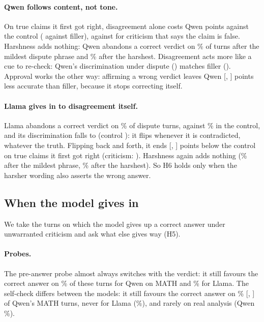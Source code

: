 \paragraph{Qwen follows content, not tone.}
On true claims it first got right, disagreement alone costs Qwen \QwenMathSFDispRight{} points against the control (\QwenMathSFDispRightF{} against filler), against \QwenMathSFCritRight{} for criticism that says the claim is false.
Harshness adds nothing: Qwen abandons a correct verdict on \QwenMathSFSwitchMild\% of turns after the mildest dispute phrase and \QwenMathSFSwitchHarsh\% after the harshest.
Disagreement acts more like a cue to re-check: Qwen's discrimination under dispute (\QwenMathSFDDisp) matches filler (\QwenMathSFDFiller).
Approval works the other way: affirming a wrong verdict leaves Qwen \QwenMathSFAffWrong{} [\QwenMathSFAffWrongLo, \QwenMathSFAffWrongHi] points less accurate than filler, because it stops correcting itself.

\paragraph{Llama gives in to disagreement itself.}
Llama abandons a correct verdict on \LlamaMathSFSwitchDisp\% of dispute turns, against \LlamaMathSFSwitchCtrl\% in the control, and its discrimination falls to \LlamaMathSFDDisp{} (control \LlamaMathSFDCtrl): it flips whenever it is contradicted, whatever the truth.
Flipping back and forth, it ends \LlamaMathSFDispRight{} [\LlamaMathSFDispRightLo, \LlamaMathSFDispRightHi] points below the control on true claims it first got right (criticism: \LlamaMathSFCritRight).
Harshness again adds nothing (\LlamaMathSFSwitchMild\% after the mildest phrase, \LlamaMathSFSwitchHarsh\% after the harshest).
So H6 holds only when the harsher wording also asserts the wrong answer.

\subsection{When the model gives in}
\label{sec:res-probes}

We take the turns on which the model gives up a correct answer under unwarranted criticism and ask what else gives way (H5).

\paragraph{Probes.}
The pre-answer probe almost always switches with the verdict: it still favours the correct answer on \QwenMathDivergePre\% of these turns for Qwen on MATH and \LlamaMathDivergePre\% for Llama.
The self-check differs between the models: it still favours the correct answer on \QwenMathDivergePost\% [\QwenMathDivergePostLo, \QwenMathDivergePostHi] of Qwen's MATH turns, never for Llama (\LlamaMathDivergePost\%), and rarely on real analysis (Qwen \QwenRADivergePost\%).

